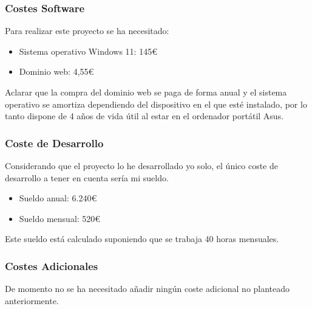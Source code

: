 \subsubsection{Costes Software}
Para realizar este proyecto se ha necesitado:
\begin{itemize}
    \item Sistema operativo Windows 11: 145€
    \item Dominio web: 4,55€
\end{itemize}
Aclarar que la compra del dominio web se paga de forma anual y el sistema operativo se amortiza dependiendo del dispositivo en el que esté instalado, por lo tanto dispone de 4 años de vida útil al estar en el ordenador portátil Asus.
\subsubsection{Coste de Desarrollo}
Considerando que el proyecto lo he desarrollado yo solo, el único coste de desarrollo a tener en cuenta sería mi sueldo.
\begin{itemize}
    \item Sueldo anual: 6.240€
    \item Sueldo mensual: 520€
\end{itemize}
Este sueldo está calculado suponiendo que se trabaja 40 horas mensuales.
\subsubsection{Costes Adicionales}
De momento no se ha necesitado añadir ningún coste adicional no planteado anteriormente.
